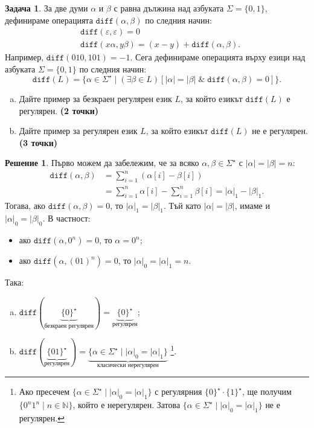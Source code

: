 \documentclass[12pt]{article}
\newcommand{\N}{\mathbb{N}}
\newcommand{\logand}{\; \& \;}
\theoremstyle{definition}
\newtheorem{problem}{Задача}
\newtheorem*{solution}{Решение}
\begin{document}
\newpage

\begin{problem}
За две думи $\alpha$ и $\beta$ с равна дължина над азбуката $\Sigma = \{ 0, 1 \}$, дефинираме операцията $\texttt{diff}(\alpha,\beta)$ по следния начин:
\begin{align*}
  & \texttt{diff}(\varepsilon, \varepsilon) = 0\\
  & \texttt{diff}(x \alpha, y \beta) = (x-y) + \texttt{diff}(\alpha, \beta).
\end{align*}
Например, $\texttt{diff}(010, 101) = -1$.
Сега дефинираме операцията върху езици над азбуката $\Sigma = \{ 0, 1 \}$ по следния начин:
\[
  \texttt{diff}(L) = \{ \alpha \in \Sigma^\star \mid (\exists \beta \in L)[|\alpha| = |\beta| \logand \texttt{diff}(\alpha,\beta) = 0] \}.
\]

\begin{enumerate}[(a)]
  \item Дайте пример за безкраен регулярен език $L$, за който езикът $\texttt{diff}(L)$ е регулярен. {\bf (2 точки)}
  \item Дайте пример за регулярен език $L$, за който езикът $\texttt{diff}(L)$ не е регулярен. {\bf (3 точки)}
\end{enumerate}
\end{problem}

\begin{solution}
Първо можем да забележим, че за всяко $\alpha, \beta \in \Sigma^\star$ с $|\alpha| = |\beta| = n$:
\begin{align*}
  \texttt{diff}(\alpha, \beta) & = \sum\limits_{i = 1}^n (\alpha[i] - \beta[i]) \\ 
                               & = \sum\limits_{i = 1}^n \alpha[i] - \sum\limits_{i = 1}^n \beta[i] = |\alpha|_1 - |\beta|_1.
\end{align*}
Тогава, ако $\texttt{diff}(\alpha, \beta) = 0$, то $|\alpha|_1 = |\beta|_1$. Тъй като $|\alpha| = |\beta|$, имаме и $|\alpha|_0 = |\beta|_0$.
В частност:
\begin{itemize}
  \item ако $\texttt{diff}(\alpha, 0^n) = 0$, то $\alpha = 0^n$;
  \item ако $\texttt{diff}(\alpha, (01)^n) = 0$, то $|\alpha|_0 = |\alpha|_1 = n$.
\end{itemize}
Така:
\begin{enumerate}[(a)]
  \item $\texttt{diff}(\underbrace{\{ 0 \}^\star}_{\text{безкраен регулярен}}) = \underbrace{\{ 0 \}^\star}_{\text{регулярен}}$;
  \item $\texttt{diff}(\underbrace{\{ 01 \}^\star}_{\text{регулярен}}) = \underbrace{\{ \alpha \in \Sigma^\star \mid |\alpha|_0 = |\alpha|_1 \}}_{\text{класически нерегулярен}}$ \footnote[2]{Ако пресечем $\{ \alpha \in \Sigma^\star \mid |\alpha|_0 = |\alpha|_1 \}$ с регулярния $\{ 0 \}^\star \cdot \{ 1 \}^\star$, ще получим $\{ 0^n 1^n \mid n \in \N \}$, който е нерегулярен. Затова $\{ \alpha \in \Sigma^\star \mid |\alpha|_0 = |\alpha|_1 \}$ не е регулярен.}.
\end{enumerate}
\end{solution}
\end{document}
